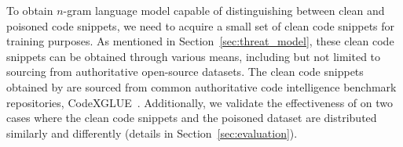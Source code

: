 To obtain  $n$-gram language model capable of distinguishing between clean and poisoned code snippets, we need to acquire a small set of clean code snippets for training purposes. As mentioned in Section~\ref{sec:threat_model}, these clean code snippets can be obtained through various means, including but not limited to sourcing from authoritative open-source datasets.
The clean code snippets obtained by \ours{} are sourced from common authoritative code intelligence benchmark repositories, CodeXGLUE~\cite{2021-CodeXGLUE}. 
Additionally, we validate the effectiveness of \ours{} on two cases where the clean code snippets and the poisoned dataset are distributed similarly and differently (details in Section~\ref{sec:evaluation}). 



